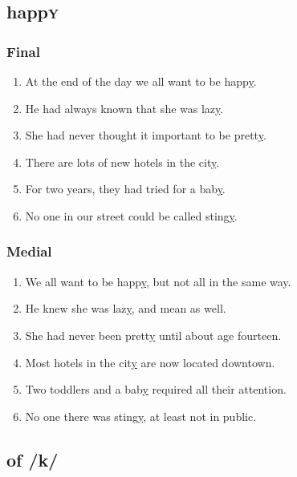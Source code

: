 	\subsection*{happ\textsc{y}}
	\label{sec:happy}

	\begin{minipage}[t]{0.49\textwidth}
		\subsubsection*{Final}
			\begin{enumerate}\footnotesize
				\item At the end of the day we all want to be happ\uline{y}.
				\item He had always known that she was laz\uline{y}.
				\item She had never thought it important to be prett\uline{y}.
				\item There are lots of new hotels in the cit\uline{y}.
				\item For two years, they had tried for a bab\uline{y}.
				\item No one in our street could be called sting\uline{y}.
			\end{enumerate}
	\end{minipage}
	\begin{minipage}[t]{0.49\textwidth}
		\subsubsection*{Medial}
			\begin{enumerate}\footnotesize
				\item We all want to be happ\uline{y}, but not all in the same way.
				\item He knew she was laz\uline{y}, and mean as well.
				\item She had never been prett\uline{y} until about age fourteen.
				\item Most hotels in the cit\uline{y} are now located downtown.
				\item Two toddlers and a bab\uline{y} required all their attention.
				\item No one there was sting\uline{y}, at least not in public.
			\end{enumerate}
	\end{minipage}

	\subsection*{ of /k/}
	\label{sec:k}

